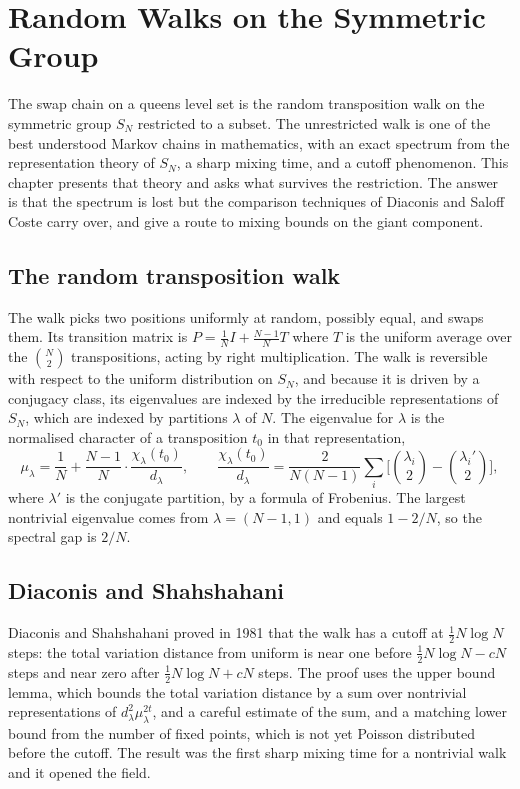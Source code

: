 \chapter{Random Walks on the Symmetric Group}
\label{ch:symmetric}

The swap chain on a queens level set is the random transposition walk on the symmetric group $S_N$ restricted to a subset. The unrestricted walk is one of the best understood Markov chains in mathematics, with an exact spectrum from the representation theory of $S_N$, a sharp mixing time, and a cutoff phenomenon. This chapter presents that theory and asks what survives the restriction. The answer is that the spectrum is lost but the comparison techniques of Diaconis and Saloff Coste carry over, and give a route to mixing bounds on the giant component.

\section{The random transposition walk}

The walk picks two positions uniformly at random, possibly equal, and swaps them. Its transition matrix is $P = \tfrac{1}{N} I + \tfrac{N-1}{N} T$ where $T$ is the uniform average over the $\binom{N}{2}$ transpositions, acting by right multiplication. The walk is reversible with respect to the uniform distribution on $S_N$, and because it is driven by a conjugacy class, its eigenvalues are indexed by the irreducible representations of $S_N$, which are indexed by partitions $\lambda$ of $N$. The eigenvalue for $\lambda$ is the normalised character of a transposition $t_0$ in that representation,
\[
\mu_\lambda = \frac{1}{N} + \frac{N-1}{N} \cdot \frac{\chi_\lambda(t_0)}{d_\lambda} , \qquad \frac{\chi_\lambda(t_0)}{d_\lambda} = \frac{2}{N(N-1)} \sum_i \Big[ \binom{\lambda_i}{2} - \binom{\lambda_i'}{2} \Big] ,
\]
where $\lambda'$ is the conjugate partition, by a formula of Frobenius. The largest nontrivial eigenvalue comes from $\lambda = (N-1, 1)$ and equals $1 - 2/N$, so the spectral gap is $2/N$.

\section{Diaconis and Shahshahani}

Diaconis and Shahshahani proved in 1981 that the walk has a cutoff at $\tfrac12 N \log N$ steps: the total variation distance from uniform is near one before $\tfrac12 N \log N - cN$ steps and near zero after $\tfrac12 N \log N + cN$ steps. The proof uses the upper bound lemma, which bounds the total variation distance by a sum over nontrivial representations of $d_\lambda^2 \mu_\lambda^{2t}$, and a careful estimate of the sum, and a matching lower bound from the number of fixed points, which is not yet Poisson distributed before the cutoff. The result was the first sharp mixing time for a nontrivial walk and it opened the field.


